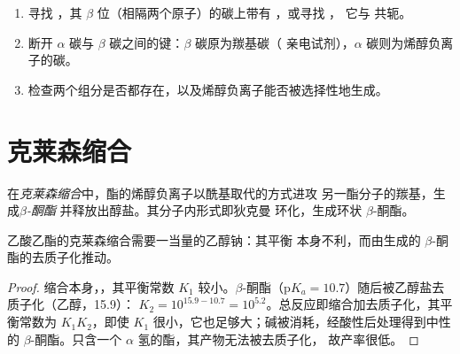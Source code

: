 \begin{method}[识别羟醛产物]\label{met:b2:enolates-aldol:aldol-recognition}
\begin{enumerate}
  \item 寻找 ，其 $\beta$ 位（相隔两个原子）的碳上带有 ，或寻找 ，
        它与  共轭。
  \item 断开 $\alpha$ 碳与 $\beta$ 碳之间的键：$\beta$ 碳原为羰基碳（
        亲电试剂），$\alpha$ 碳则为烯醇负离子的碳。
  \item 检查两个组分是否都存在，以及烯醇负离子能否被选择性地生成。
\end{enumerate}
\end{method}

\section{克莱森缩合}

\begin{definition}[克莱森缩合]\label{def:b2:enolates-aldol:claisen}
在\emph{克莱森缩合}中，酯的烯醇负离子以酰基取代的方式进攻
另一酯分子的羰基，生成\emph{$\beta$-酮酯}
并释放出醇盐。其分子内形式即狄克曼
环化，生成环状 $\beta$-酮酯。
\end{definition}

\begin{proposition}[驱动克莱森缩合的因素]\label{prop:b2:enolates-aldol:claisen-drive}
乙酸乙酯的克莱森缩合需要一当量的乙醇钠：其平衡
本身不利，而由生成的 $\beta$-酮酯的去质子化推动。
\end{proposition}

\begin{proof}
缩合本身，，其平衡常数
$K_1$ 较小。$\beta$-酮酯（$\mathrm pK_a = 10.7$）随后被乙醇盐去质子化（乙醇，15.9）：
$K_2 = 10^{15.9 - 10.7} = 10^{5.2}$。总反应即缩合加去质子化，其平衡常数为
$K_1K_2$，即使 $K_1$ 很小，它也足够大；碱被消耗，经酸性后处理得到中性的
$\beta$-酮酯。只含一个 $\alpha$ 氢的酯，其产物无法被去质子化，
故产率很低。
\end{proof}

